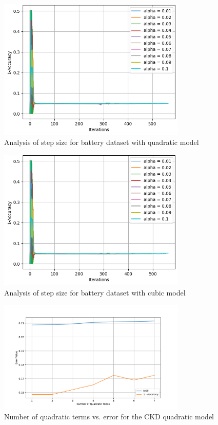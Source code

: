 \documentclass{article}
\begin{document}
\begin{figure}[H]
  \centering
  \includegraphics[width=0.8\textwidth]{Batmodel4.png}
  \caption{Analysis of step size for battery dataset with quadratic model}
  \label{fig:quad_battery}
\end{figure}

\begin{figure}[H]
  \centering
  \includegraphics[width=0.8\textwidth]{Batmodel5.png}
  \caption{Analysis of step size for battery dataset with cubic model }
  \label{fig:quad_battery}
\end{figure}

\begin{figure}[H]
  \centering
  \includegraphics[width=0.8\textwidth]{quad_ckd.pdf}
  \caption{Number of quadratic terms vs. error for the CKD quadratic model}
  \label{fig:quad_ckd}
\end{figure}
\end{document}
